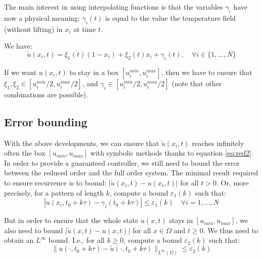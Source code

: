

The main interest in using interpolating functions is 
that the variables $\gamma_i$ have now a physical meaning: $\gamma_i(t)$ 
is equal to the value the temperature field (without lifting) in $x_i$ at time $t$.

We have:
\begin{equation}
\tilde u(x_i,t) =  \xi_1(t)(1-x_i) + \xi_2(t)x_i +  \gamma_i (t), \quad \forall i \in \{1,\dots, N\}
\end{equation}

If we want $u(x_i,t)$ to stay in a box $[u_i^{min},u_i^{max}]$, then 
we have to ensure that $\xi_1,\xi_2 \in [u_i^{min}/2,u_i^{max}/2]$, 
and $\gamma_i \in [u_i^{min}/2,u_i^{max}/2]$ (note that other combinations are possible).

\subsection{Error bounding}
\label{sec:bound}

With the above developments, we can ensure that $\tilde u(x_i,t)$ reaches infinitely often the box $[u_{min},u_{max}]$
with symbolic methods thanks to equation \eqref{eq:red2}.
In order to provide a guaranteed controller,
we still need to bound the error between the reduced order and the full
order system.
The minimal result required to ensure 
recurrence is to bound: $\vert \tilde u (x_i,t) - u(x_i,t) \vert$ for all $t >0$.
Or, more precisely, for a pattern of length $k$, compute a bound $\varepsilon_1 (k)$ such that:
\begin{equation}
 | u(x_i,t_0 + k \tau) - \gamma_i(t_0 + k \tau) | \leq \varepsilon_1(k) \quad \forall i = 1, \dots,N
\end{equation}

But in order to ensure that the whole state $u(x,t)$ stays in $[u_{min},u_{max}]$, 
we also need to bound $\vert \tilde u (x,t) - u(x,t) \vert$ for all $x \in \Omega$ and $t \geq 0$.
We thus need to obtain an $L^\infty$ bound. I.e., for all $k \geq 0$,
compute a bound $\varepsilon_2(k)$ such that:
\begin{equation}
 \| u(\cdot,t_0 + k \tau) - \tilde u(\cdot,t_0 + k \tau) \|_{L^\infty(\Omega)} \leq \varepsilon_2(k) 
\end{equation}











